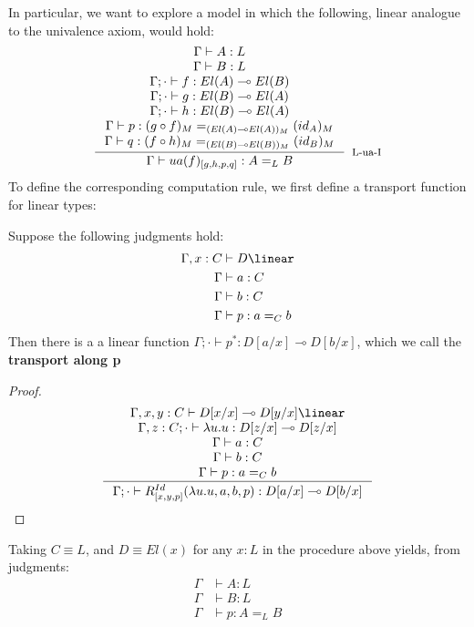 In particular, we want to explore a model in which the following, linear analogue to the univalence axiom, would hold:
\[
  \inference{
    \Gamma \vdash A : L\\
    \Gamma \vdash B : L\\
    \Gamma; \cdot \vdash f : El(A) \multimap El(B)\\
    \Gamma; \cdot \vdash g : El(B) \multimap El(A)\\
    \Gamma; \cdot \vdash h : El(B) \multimap El(A)\\
    \Gamma \vdash p : (g \circ f)_M  =_{(El(A) \multimap El(A))_M} (id_A)_M\\
    \Gamma \vdash q : (f \circ h)_M =_{(El(B) \multimap El(B))_M} (id_B)_M\\
    }{\Gamma \vdash ua(f)_{[g, h, p, q]} : A =_L B}[L-ua-I]
  \]
  To define the corresponding computation rule, we first define a transport function for linear types:
  \begin{lemm}
    Suppose the following judgments hold:
    \[
      \begin{split}
        \Gamma, x : C &\vdash D \linear\\
        \Gamma &\vdash a : C\\
        \Gamma &\vdash b : C\\
        \Gamma &\vdash p : a =_C b
        \end{split}
      \]
      Then there is a a linear function $\Gamma; \cdot \vdash p^* : D[a/x] \multimap D[b/x]$, which we call the \textbf{transport along p}
      \begin{proof}
        \[
          \inference{
\Gamma, x, y : C \vdash D[x/x] \multimap D[y/x] \linear\\
\Gamma, z : C ; \cdot \vdash \lambda u.u :D[z/x] \multimap D[z/x]\\
\Gamma \vdash a : C\\
\Gamma \vdash b : C\\
\Gamma \vdash p : a=_C b
}
{\Gamma; \cdot \vdash R^{Id}_{[x, y, p]}(\lambda u.u, a, b, p) : D[a/x] \multimap D[b/x]}
\]
      \end{proof}
    \end{lemm}
    Taking $C \equiv L$, and $D \equiv El(x)$ for any $x : L$ in the procedure above yields, from judgments:
    \[
      \begin{split}
        \Gamma &\vdash A : L\\
        \Gamma &\vdash B : L\\
        \Gamma &\vdash p : A =_L B
      \end{split}
    \]
